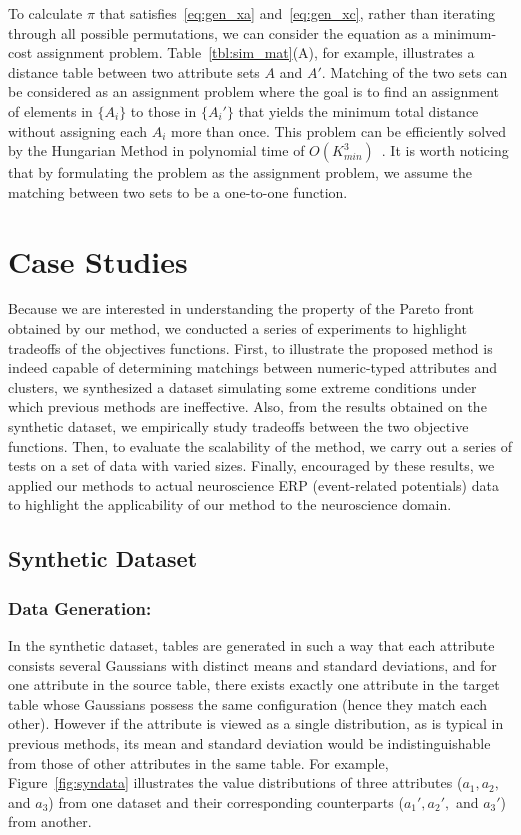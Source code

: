 To calculate $\pi$ that satisfies~\ref{eq:gen_xa} and~\ref{eq:gen_xc}, rather than iterating through all possible permutations, we can consider the equation as a minimum-cost assignment problem. Table~\ref{tbl:sim_mat}(A), for example, illustrates a distance table between two attribute sets $A$ and $A'$. Matching of the two sets can be considered as an assignment problem where the goal is to find an assignment of elements in $\{A_i\}$ to those in $\{A_i'\}$ that yields the minimum total distance without assigning each $A_i$ more than once. This problem can be efficiently solved by the Hungarian Method in polynomial time of $O(K_{min}^3)$~\cite{Kuhn1955}. It is worth noticing that by formulating the problem as the assignment problem, we assume the matching between two sets to be a one-to-one function.

\section{Case Studies}
\label{sec:experiment}
Because we are interested in understanding the property of the Pareto front obtained by our method, we conducted a series of experiments to highlight tradeoffs of the objectives functions. First, to illustrate the proposed method is indeed capable of determining matchings between numeric-typed attributes and clusters, we synthesized a dataset simulating some extreme conditions under which previous methods are ineffective. Also, from the results obtained on the synthetic dataset, we empirically study tradeoffs between the two objective functions. Then, to evaluate the scalability of the method, we carry out a series of tests on a set of data with varied sizes. Finally, encouraged by these results, we applied our methods to actual neuroscience ERP (event-related potentials) data to highlight the applicability of our method to the neuroscience domain.

\subsection{Synthetic Dataset}
\label{sec:syn_exp}
\subsubsection{Data Generation:}

In the synthetic dataset, tables are generated in such a way that each attribute consists several Gaussians with distinct means and standard deviations, and for one attribute in the source table, there exists exactly one attribute in the target table whose Gaussians possess the same configuration (hence they match each other). However if the attribute is viewed as a single distribution, as is typical in previous methods, its mean and standard deviation would be indistinguishable from those of other attributes in the same table. For example, Figure~\ref{fig:syndata} illustrates the value distributions of three attributes ($a_1, a_2,$ and $a_3$) from one dataset and their corresponding counterparts ($a_1', a_2',$ and $a_3'$) from another.

